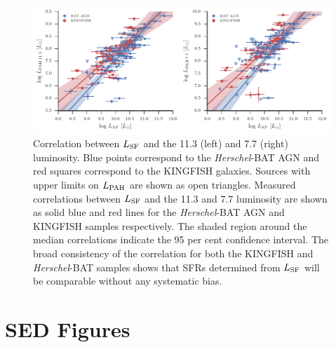 \documentclass[fleqn, usenatbib]{mnras}
\newcommand{\herschel}{\emph{Herschel}}
\begin{document}
\begin{figure}
\includegraphics{figures/lsf-vs-lpah}
\caption{Correlation between $L_{\rm SF}$ and the 11.3 (left) and 7.7 \micron{} (right) luminosity. Blue points correspond to the \herschel-BAT AGN and red squares correspond to the KINGFISH galaxies. Sources with upper limits on $L_{\rm PAH}$ are shown as open triangles. Measured correlations between $L_{\rm SF}$ and the 11.3 and 7.7 \micron{} luminosity are shown as solid blue and red lines for the \herschel-BAT AGN and KINGFISH samples respectively. The shaded region around the median correlations indicate the 95 per cent confidence interval. The broad consistency of the correlation for both the KINGFISH and \herschel-BAT samples shows that SFRs determined from $L_{\rm SF}$ will be comparable without any systematic bias. \label{fig:lsf_lpah}}
\end{figure}

\section{SED Figures}
\end{document}
